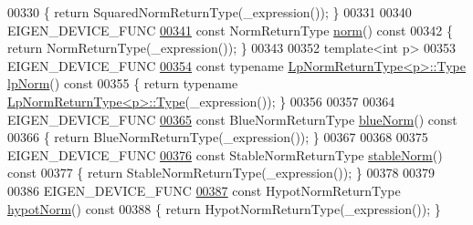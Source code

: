 \begin{DoxyCode}
00330 \textcolor{keyword}{    }\{ \textcolor{keywordflow}{return} SquaredNormReturnType(\_expression()); \}
00331 
00340     EIGEN\_DEVICE\_FUNC
\hyperlink{group___core___module_a1c098483dfb35329f11b769cb5c1b6c1}{00341}     \textcolor{keyword}{const} NormReturnType \hyperlink{group___core___module_a1c098483dfb35329f11b769cb5c1b6c1}{norm}()\textcolor{keyword}{ const}
00342 \textcolor{keyword}{    }\{ \textcolor{keywordflow}{return} NormReturnType(\_expression()); \}
00343 
00352     \textcolor{keyword}{template}<\textcolor{keywordtype}{int} p>
00353     EIGEN\_DEVICE\_FUNC
\hyperlink{group___core___module_a87b514857655134e74ee313d865ab6d6}{00354}     \textcolor{keyword}{const} \textcolor{keyword}{typename} \hyperlink{group___core___module_class_eigen_1_1_partial_redux_expr}{LpNormReturnType<p>::Type} \hyperlink{group___core___module_a87b514857655134e74ee313d865ab6d6}{lpNorm}()\textcolor{keyword}{ const}
00355 \textcolor{keyword}{    }\{ \textcolor{keywordflow}{return} \textcolor{keyword}{typename} \hyperlink{group___core___module_class_eigen_1_1_partial_redux_expr}{LpNormReturnType<p>::Type}(\_expression()); \}
00356 
00357 
00364     EIGEN\_DEVICE\_FUNC
\hyperlink{group___core___module_ae1d431dae7e328e1e6d08d2fb5dc6c22}{00365}     \textcolor{keyword}{const} BlueNormReturnType \hyperlink{group___core___module_ae1d431dae7e328e1e6d08d2fb5dc6c22}{blueNorm}()\textcolor{keyword}{ const}
00366 \textcolor{keyword}{    }\{ \textcolor{keywordflow}{return} BlueNormReturnType(\_expression()); \}
00367 
00368 
00375     EIGEN\_DEVICE\_FUNC
\hyperlink{group___core___module_adfa17a946f1bd845b85cba8cf34732ac}{00376}     \textcolor{keyword}{const} StableNormReturnType \hyperlink{group___core___module_adfa17a946f1bd845b85cba8cf34732ac}{stableNorm}()\textcolor{keyword}{ const}
00377 \textcolor{keyword}{    }\{ \textcolor{keywordflow}{return} StableNormReturnType(\_expression()); \}
00378 
00379 
00386     EIGEN\_DEVICE\_FUNC
\hyperlink{group___core___module_a9ae3feb2723628a3bcff6eabda2fa77d}{00387}     \textcolor{keyword}{const} HypotNormReturnType \hyperlink{group___core___module_a9ae3feb2723628a3bcff6eabda2fa77d}{hypotNorm}()\textcolor{keyword}{ const}
00388 \textcolor{keyword}{    }\{ \textcolor{keywordflow}{return} HypotNormReturnType(\_expression()); \}

\end{DoxyCode}
